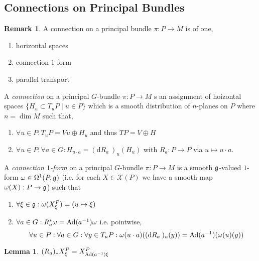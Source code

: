 \documentclass[12pt]{extarticle}
\renewcommand{\d}[1]{ \mathrm{d}#1 \:}
\theoremstyle{definition}
\newtheorem{lemma}[theorem]{Lemma}
\newtheorem{remark}{Remark}
\newenvironment{definition}[1][Definition:]{\begin{trivlist}
\item[\hskip \labelsep {\bfseries #1}]}{\end{trivlist}}
\begin{document}
\subsection{Connections on Principal Bundles}

\begin{remark}
A connection on a principal bundle $\pi : P \to M$ is of one,
\begin{enumerate}
\item horizontal spaces

\item connection $1$-form

\item parallel transport
\end{enumerate}
\end{remark}


\begin{definition}
A \textit{connection} on a principal $G$-bundle $\pi : P \to M$ s an assignment of hoizontal spaces $\{ H_u \subset T_u P \mid u \in P \}$ which is a smooth distribution of $n$-planes on $P$ where $n = \dim{M}$ such that,
\begin{enumerate}
\item $\forall u \in P : T_u P = Vu \oplus H_u$ and thus $TP = V \oplus H$
\item $\forall u \in P : \forall a \in G : H_{u \cdot a} = (\d{R_a})_u (H_u)$ with $R_a : P \to P$ via $u \mapsto u \cdot a$. 
\end{enumerate}
\end{definition}

\begin{definition}
A \textit{connection $1$-form} on a principal $G$-bundle $\pi : P \to M$ is a smooth $\mathfrak{g}$-valued $1$-form $\omega \in \Omega^1(P, \mathfrak{g})$ (i.e. for each $X \in \mathscr{X}(P)$ we have a smooth map $\omega(X) : P \to \mathfrak{g}$) such that
\begin{enumerate}
\item $\forall \xi \in \mathfrak{g} : \omega(X^P_\xi) = (u \mapsto \xi)$
\item $\forall a \in G : R_a^* \omega = \mathrm{Ad}(a^{-1}) \omega$ i.e. pointwise, 
\[ \forall u \in P : \forall a \in G : \forall y \in T_u P : \omega(u \cdot a)((\d{R_a})_u(y)) = \Ad(a^{-1})(\omega(u)(y)) \]
\end{enumerate}
\end{definition}

\begin{lemma}
$(R_a)_* X^P_\xi = X^P_{\mathrm{Ad}(a^{-1}) \xi}$ 
\end{lemma}
\end{document}
